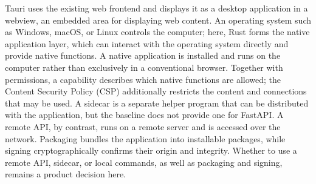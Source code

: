 \begin{beginnerstatement}

Tauri uses the existing web frontend and displays it as a desktop application
in a webview, an embedded area for displaying web content. An operating system
such as Windows, macOS, or Linux controls the computer; here, Rust forms the
native application layer, which can interact with the operating system directly
and provide native functions. A native application is installed and runs on the
computer rather than exclusively in a conventional browser. Together with
permissions, a capability describes which native functions are allowed; the
Content Security Policy (CSP) additionally restricts the content and connections
that may be used. A sidecar is a separate helper program that can be distributed
with the application, but the baseline does not provide one for FastAPI. A
remote API, by contrast, runs on a remote server and is accessed over the
network. Packaging bundles the application into installable packages, while
signing cryptographically confirms their origin and integrity. Whether to use a
remote API, sidecar, or local commands, as well as packaging and signing,
remains a product decision here.

\end{beginnerstatement}
